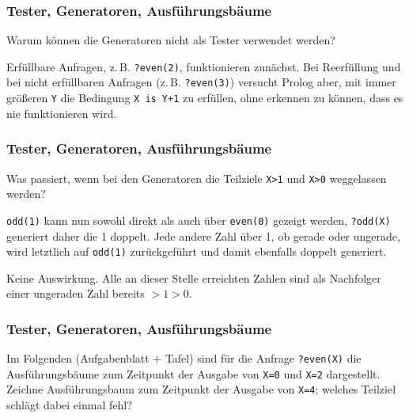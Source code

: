 \documentclass{beamer}
\begin{document}
\begin{frame}
  \frametitle{Tester, Generatoren, Ausführungsbäume}
  
  Warum können die Generatoren nicht als Tester verwendet werden?
  
  \pause
  Erfüllbare Anfragen, z.\,B. \lstinline{?even(2)}, funktionieren zunächst.
  Bei Reerfüllung und bei nicht erfüllbaren Anfragen (z.\,B. \lstinline{?even(3)}) versucht Prolog aber,
  mit immer größeren \lstinline{Y} die Bedingung \lstinline{X is Y+1} zu erfüllen,
  ohne erkennen zu können, dass es nie funktionieren wird.
\end{frame}

\begin{frame}
  \frametitle{Tester, Generatoren, Ausführungsbäume}
  
  Was passiert, wenn bei den Generatoren die Teilziele \lstinline{X>1} und \lstinline{X>0} weggelassen werden?
  
  \begin{description}
  \pause
  \item[\texttt{X>1}]
    \lstinline{odd(1)} kann nun sowohl direkt als auch über \lstinline{even(0)} gezeigt werden,
    \lstinline{?odd(X)} generiert daher die 1 doppelt.
    Jede andere Zahl über 1, ob gerade oder ungerade, wird letztlich auf \lstinline{odd(1)} zurückgeführt und damit ebenfalls doppelt generiert.
  \pause
  \item[\texttt{X>0}]
    Keine Auswirkung.
    Alle an dieser Stelle erreichten Zahlen sind als Nachfolger einer ungeraden Zahl bereits $>1>0$.
  \end{description}
\end{frame}

\begin{frame}
  \frametitle{Tester, Generatoren, Ausführungsbäume}
  
  Im Folgenden (Aufgabenblatt + Tafel) sind für die Anfrage \lstinline{?even(X)} die Ausführungsbäume zum Zeitpunkt der Ausgabe von \lstinline{X=0} und \lstinline{X=2} dargestellt.
  Zeichne Ausführungsbaum zum Zeitpunkt der Ausgabe von \lstinline{X=4}; welches Teilziel schlägt dabei einmal fehl?
\end{frame}
\end{document}
